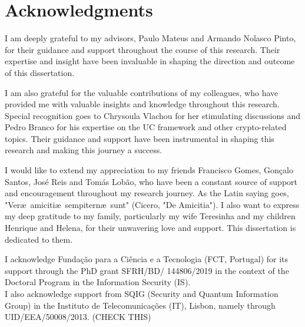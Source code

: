 

\chapter*{Acknowledgments}

I am deeply grateful to my advisors, Paulo Mateus and Armando Nolasco Pinto, for their guidance and support throughout the course of this research. Their expertise and insight have been invaluable in shaping the direction and outcome of this dissertation.


I am also grateful for the valuable contributions of my colleagues, who have provided me with valuable insights and knowledge throughout this research. Special recognition goes to Chrysoula Vlachou for her stimulating discussions and Pedro Branco for his expertise on the UC framework and other crypto-related topics. Their guidance and support have been instrumental in shaping this research and making this journey a success.

I would like to extend my appreciation to my friends Francisco Gomes, Gonçalo Santos, José Reis and Tomás Lobão, who have been a constant source of support and encouragement throughout my research journey. As the Latin saying goes, "Ver\ae\ amiciti\ae\ sempitern\ae\ sunt" (Cicero, "De Amicitia"). I also want to express my deep gratitude to my family, particularly my wife Teresinha and my children Henrique and Helena, for their unwavering love and support. This dissertation is dedicated to them.

\vfill
\begin{center}\begin{footnotesize}
I acknowledge Funda\c{c}\~{a}o para a Ci\^{e}ncia e a Tecnologia (FCT, Portugal) for its support through the PhD grant SFRH/BD/ 144806/2019 in the context of the Doctoral Program in the Information Security (IS).\\
I also acknowledge support from SQIG (Security and Quantum Information Group) in the Instituto de Telecomunica\c{c}\~{o}es (IT), Lisbon, namely through UID/EEA/50008/2013. {\cv(CHECK THIS)}
\end{footnotesize}
\end{center}

